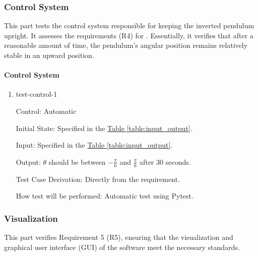 \documentclass[12pt, titlepage]{article}
\begin{document}
\subsubsection{Control System}

This part tests the control system responsible for keeping 
the inverted pendulum upright. It assesses the requirements 
(R4) for \progname{}. Essentially, it verifies that after a 
reasonable amount of time, the pendulum's angular position 
remains relatively stable in an upward position.

		
\paragraph{Control System}

\begin{enumerate}

\item{test-control-1\\}

Control: Automatic
					
Initial State: Specified in the \hyperref[table:input_output]{Table \ref*{table:input_output}}.
					
Input: Specified in the \hyperref[table:input_output]{Table \ref*{table:input_output}}.
					
Output: $\theta$ should be between $-\frac{\pi}{6}$ and $\frac{\pi}{6}$ after 30 seconds.

Test Case Derivation: Directly from the requirement.
					
How test will be performed: 
Automatic test using Pytest.

\end{enumerate}

\subsubsection{Visualization} \label{func_test_visualization}

This part verifies Requirement 5 (R5), ensuring that the visualization 
and graphical user interface (GUI) of the software meet the necessary standards.
\end{document}
